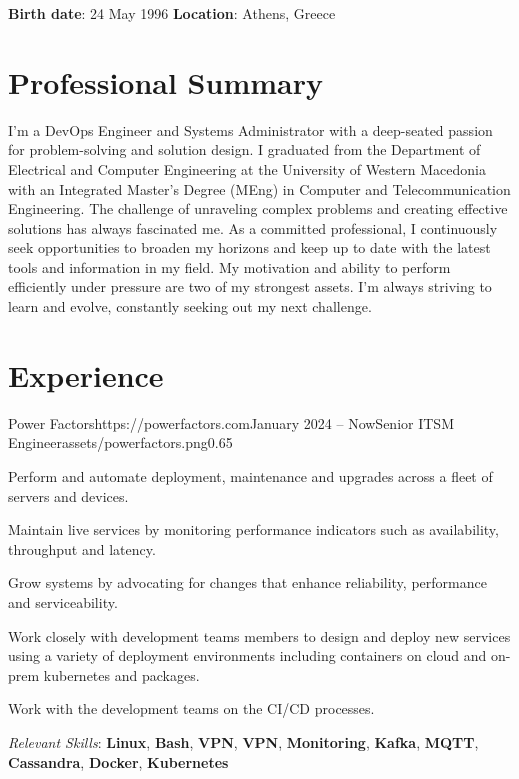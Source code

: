 \documentclass{mycv}
\begin{document}
	\pagestyle{empty}
	\begin{center}
		\textbf{Birth date}: 24 May 1996 {\Large\textperiodcentered} \textbf{Location}: Athens, Greece
	\end{center}

	\section{Professional Summary}
	I’m a DevOps Engineer and Systems Administrator with a deep-seated passion for problem-solving and solution design. I graduated from the Department of Electrical and Computer Engineering at the University of Western Macedonia with an Integrated Master's Degree (MEng) in Computer and Telecommunication Engineering. The challenge of unraveling complex problems and creating effective solutions has always fascinated me. As a committed professional, I continuously seek opportunities to broaden my horizons and keep up to date with the latest tools and information in my field. My motivation and ability to perform efficiently under pressure are two of my strongest assets. I'm always striving to learn and evolve, constantly seeking out my next challenge.

	\section{Experience}

	\begin{EntryDatedLogo}{Power Factors}{https://powerfactors.com}{January 2024 -- Now}{Senior ITSM Engineer}{assets/powerfactors.png}{0.65}
		\begin{Itemize}
			\item Perform and automate deployment, maintenance and upgrades across a fleet of servers and devices.
			\item Maintain live services by monitoring performance indicators such as availability, throughput and latency.
			\item Grow systems by advocating for changes that enhance reliability, performance and serviceability.
			\item Work closely with development teams members to design and deploy new services using a variety of deployment environments including containers on cloud and on-prem kubernetes and packages.
			\item Work with the development teams on the CI/CD processes.
			\item \textit{Relevant Skills}: \textbf{Linux}, \textbf{Bash}, \textbf{VPN}, \textbf{VPN}, \textbf{Monitoring}, \textbf{Kafka}, \textbf{MQTT}, \textbf{Cassandra}, \textbf{Docker}, \textbf{Kubernetes}
		\end{Itemize}
	\end{EntryDatedLogo}
	
\end{document}
